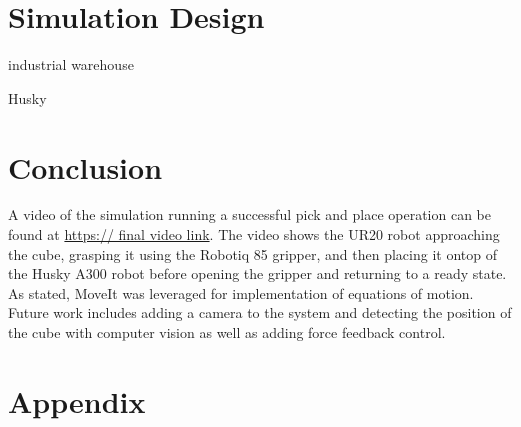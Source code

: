 \documentclass[journal]{new-aiaa}
\begin{document}
\section{Simulation Design}\label{sec:Approach}

industrial warehouse \cite{GazeboFuel-ssarkar-industrial-warehouse}

Husky \cite{GazeboFuel-OpenRobotics-MARBLE_HUSKY_SENSOR_CONFIG_5}

\section{Conclusion}\label{sec:Results}
A video of the simulation running a successful pick and place operation can be found at \url{https:// final video link}.
The video shows the UR20 robot approaching the cube, grasping it using the Robotiq 85 gripper, and then placing it ontop of the Husky A300 robot before opening the gripper and returning to a ready state.
As stated, MoveIt was leveraged for implementation of equations of motion.
Future work includes adding a camera to the system and detecting the position of the cube with computer vision as well as adding force feedback control.

\newpage
\section*{Appendix}\label{sec:Appendix}
\end{document}
